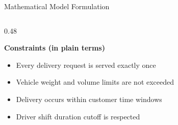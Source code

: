 \documentclass[aspectratio=169,10pt]{beamer}
\begin{document}
\begin{frame}{Mathematical Model Formulation}
\begin{columns}[T,totalwidth=\textwidth]
\begin{column}{0.48\textwidth}
\vspace{0.05cm}

\textbf{\color{Primary}\small Constraints (in plain terms)}

\begin{itemize}
\footnotesize
\setlength\itemsep{1pt}
\item Every delivery request is served exactly once
\item Vehicle weight and volume limits are not exceeded
\item Delivery occurs within customer time windows
\item Driver shift duration cutoff is respected
\end{itemize}

\end{column}

\end{columns}

\end{frame}

\end{document}
